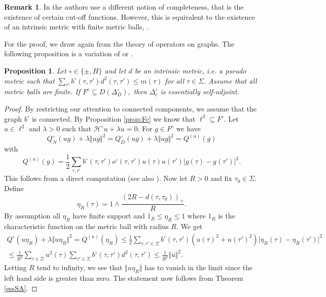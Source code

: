 \documentclass[10pt]{amsart}
\newtheorem{proposition}[theorem]{Proposition}
\theoremstyle{definition}
\newtheorem*{remark}{Remark}
\newcommand{\F}{{F}}
\renewcommand{\bullet}{{\circ}}
\begin{document}
\begin{remark}
	In \cite{ATH} the authors use a different notion of completeness, that is the existence of certain cut-off functions. However, this is equivalent to the existence of an intrinsic metric with finite metric balls, \cite[Theorem~11.31]{KLW}.
\end{remark}

For the proof, we draw again from the theory of operators on graphs. The following proposition is a variation of \cite[Theorem~2.16]{GKS} or \cite[Theorem~2]{HKMW}. %



\begin{proposition}\label{intrinsic}
 Let $\bullet\in\{\pm,H\}$ and let $d$ be an intrinsic metric, i.e. a pseudo metric such that $\sum_{\tau'}b^\bullet(\tau,\tau')d^2(\tau,\tau')\leq m(\tau)$ for all $\tau\in\Sigma.$ Assume that all metric balls are finite. If $\F^c\subseteq D(\Delta^\bullet_D),$ then $\Delta^\bullet_{c}$ is essentially self-adjoint.
\end{proposition}
\begin{proof}By restricting our attention to connected components, we assume that the graph $b^\bullet$ is connected. By Proposition \ref{prop:Fc} we know that $\ell^2\subseteq F^\bullet.$
	Let $u\in \ell^2$ and $\lambda>0$ such that $\mathcal{H}^\bullet u+\lambda u = 0.$ For $g\in F^c$ we have $$ Q^\bullet_N(ug)+\lambda\Vert ug\Vert^2 = Q^\bullet_D(ug)+\lambda\Vert ug\Vert^2 = Q^{(u)}(g)$$ with
	$$Q^{(u)}(g) = \frac{1}{2}\sum_{\tau,\tau'}b^\bullet(\tau,\tau')o^\bullet(\tau,\tau')u(\tau)u(\tau')\vert g(\tau)-g(\tau')\vert^2.$$ This follows from a direct computation (see also \cite[Proposition 2.18]{GKS}). Now let $R>0$ and fix $\tau_0\in\Sigma.$ Define $$\eta_R(\tau) = 1\wedge\frac{(2R-d(\tau,\tau_0))_+}{R}.$$ By assumption all $\eta_R$ have finite support and $1_R\leq\eta_R\leq 1$ where $1_R$ is the characteristic function on the metric ball with radius $R.$ We get
	\begin{multline*}
		 Q^\bullet(u\eta_R)+\lambda\Vert u\eta_R\Vert^2 = Q^{(u)}(\eta_R)
		\leq\frac{1}{2}\sum_{\tau,\tau'\in \Sigma}b^\bullet(\tau,\tau')(u(\tau)^2+u(\tau')^2)\vert\eta_R(\tau)-\eta_R(\tau')\vert^2\\
		 \leq\frac{1}{R^2}\sum_{\tau\in \Sigma} u^2(\tau)\sum_{\tau'\in \Sigma}b^\bullet(\tau,\tau')d^2(\tau,\tau')
		\leq\frac{1}{R^2}\Vert u\Vert^2.
	\end{multline*}
	Letting $R$ tend to infinity, we see that $\Vert u\eta_R\Vert$ has to vanish in the limit since the left hand side is greater than zero. The statement now follows from Theorem \ref{essSA}.
\end{proof}
\end{document}
